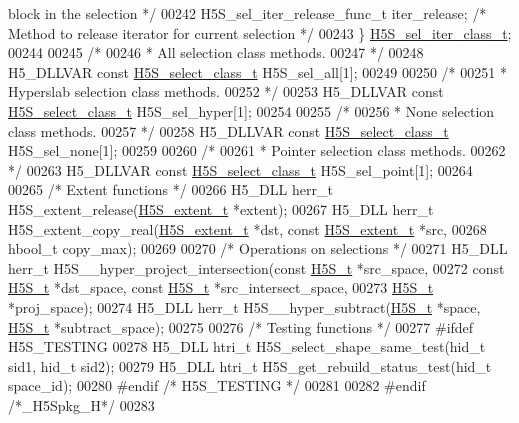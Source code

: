 \begin{DoxyCode}
{       block in the selection */}
00242     H5S\_sel\_iter\_release\_func\_t iter\_release;   \textcolor{comment}{/* Method to release iterator for current selection */}
00243 \} \hyperlink{struct_h5_s__sel__iter__class__t}{H5S\_sel\_iter\_class\_t};
00244 
00245 \textcolor{comment}{/*}
00246 \textcolor{comment}{ * All selection class methods.}
00247 \textcolor{comment}{ */}
00248 H5\_DLLVAR \textcolor{keyword}{const} \hyperlink{struct_h5_s__select__class__t}{H5S\_select\_class\_t} H5S\_sel\_all[1];
00249 
00250 \textcolor{comment}{/*}
00251 \textcolor{comment}{ * Hyperslab selection class methods.}
00252 \textcolor{comment}{ */}
00253 H5\_DLLVAR \textcolor{keyword}{const} \hyperlink{struct_h5_s__select__class__t}{H5S\_select\_class\_t} H5S\_sel\_hyper[1];
00254 
00255 \textcolor{comment}{/*}
00256 \textcolor{comment}{ * None selection class methods.}
00257 \textcolor{comment}{ */}
00258 H5\_DLLVAR \textcolor{keyword}{const} \hyperlink{struct_h5_s__select__class__t}{H5S\_select\_class\_t} H5S\_sel\_none[1];
00259 
00260 \textcolor{comment}{/*}
00261 \textcolor{comment}{ * Pointer selection class methods.}
00262 \textcolor{comment}{ */}
00263 H5\_DLLVAR \textcolor{keyword}{const} \hyperlink{struct_h5_s__select__class__t}{H5S\_select\_class\_t} H5S\_sel\_point[1];
00264 
00265 \textcolor{comment}{/* Extent functions */}
00266 H5\_DLL herr\_t H5S\_extent\_release(\hyperlink{struct_h5_s__extent__t}{H5S\_extent\_t} *extent);
00267 H5\_DLL herr\_t H5S\_extent\_copy\_real(\hyperlink{struct_h5_s__extent__t}{H5S\_extent\_t} *dst, \textcolor{keyword}{const} 
      \hyperlink{struct_h5_s__extent__t}{H5S\_extent\_t} *src,
00268     hbool\_t copy\_max);
00269 
00270 \textcolor{comment}{/* Operations on selections */}
00271 H5\_DLL herr\_t H5S\_\_hyper\_project\_intersection(\textcolor{keyword}{const} \hyperlink{struct_h5_s__t}{H5S\_t} *src\_space,
00272     \textcolor{keyword}{const} \hyperlink{struct_h5_s__t}{H5S\_t} *dst\_space, \textcolor{keyword}{const} \hyperlink{struct_h5_s__t}{H5S\_t} *src\_intersect\_space,
00273     \hyperlink{struct_h5_s__t}{H5S\_t} *proj\_space);
00274 H5\_DLL herr\_t H5S\_\_hyper\_subtract(\hyperlink{struct_h5_s__t}{H5S\_t} *space, \hyperlink{struct_h5_s__t}{H5S\_t} *subtract\_space);
00275 
00276 \textcolor{comment}{/* Testing functions */}
00277 \textcolor{preprocessor}{#ifdef H5S\_TESTING}
00278 H5\_DLL htri\_t H5S\_select\_shape\_same\_test(hid\_t sid1, hid\_t sid2);
00279 H5\_DLL htri\_t H5S\_get\_rebuild\_status\_test(hid\_t space\_id);
00280 \textcolor{preprocessor}{#endif }\textcolor{comment}{/* H5S\_TESTING */}\textcolor{preprocessor}{}
00281 
00282 \textcolor{preprocessor}{#endif }\textcolor{comment}{/*\_H5Spkg\_H*/}\textcolor{preprocessor}{}
00283 
\end{DoxyCode}
